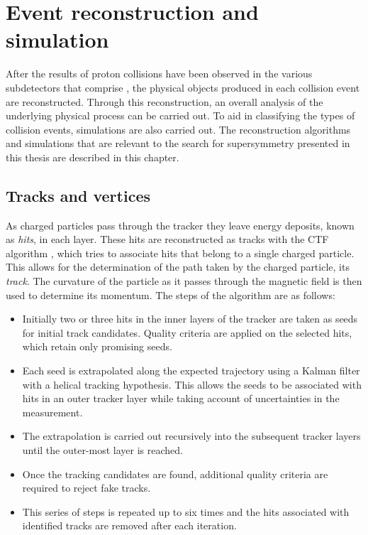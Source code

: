 \chapter{Event reconstruction and simulation}
\label{chap:reconstruction}

After the results of proton collisions have been observed in the
various subdetectors that comprise \CMS, the physical objects produced
in each collision event are reconstructed. Through this
reconstruction,
an overall analysis of the underlying physical process can be carried
out. To aid in classifying the types of collision events, \MC
simulations are also carried out. The reconstruction algorithms and
simulations that are relevant to the search for supersymmetry
presented in this thesis are described in this chapter.

\section{Tracks and vertices}
\label{sec:tracks_reco}

As charged particles pass through the \CMS tracker they leave energy
deposits, known as \emph{hits}, in each layer. These hits are
reconstructed as tracks with the \ac{CTF} algorithm
\cite{Chatrchyan:2014fea}, which tries to associate hits that belong
to a single charged particle. This allows for the determination of the
path taken by the charged particle, its \emph{track}. The curvature of
the particle as it passes through the magnetic field is then used to
determine its momentum. The steps of the algorithm are as follows:

\begin{itemize}
\item{Initially two or three hits in the inner layers of the tracker
are taken as seeds for initial track candidates. Quality
criteria are applied on the selected hits, which retain only promising
seeds.} 
\item{Each seed is extrapolated along the expected trajectory using a
Kalman filter \cite{Fruhwirth:1987fm} with a helical tracking
hypothesis. This allows the seeds to be associated with hits in an
outer tracker layer while taking account of uncertainties in the
measurement.} 
\item{The extrapolation is carried out recursively into the subsequent
tracker layers until the outer-most layer is reached.} 
\item{Once the tracking candidates are found, additional quality
criteria are required to reject fake tracks.}
\item{This series of steps is repeated up to six times and the hits
associated with identified tracks are removed after each iteration. }
\end{itemize}

